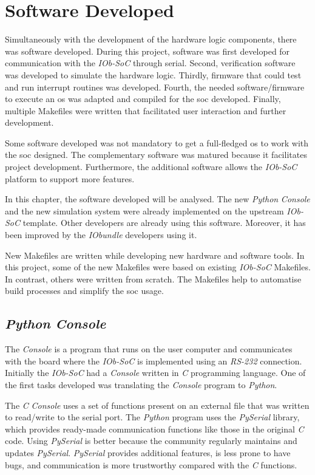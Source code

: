 \chapter{Software Developed}
\label{chapter:software_developed}
Simultaneously with the development of the hardware logic components, there was software developed. During this project, software was first developed for communication with the \textit{IOb-SoC} through serial. Second, verification software was developed to simulate the hardware logic. Thirdly, firmware that could test and run interrupt routines was developed. Fourth, the needed software/firmware to execute an \acrlong{os} was adapted and compiled for the \acrshort{soc} developed. Finally, multiple Makefiles were written that facilitated user interaction and further development.

Some software developed was not mandatory to get a full-fledged \acrlong{os} to work with the \acrlong{soc} designed. The complementary software was matured because it facilitates project development. Furthermore, the additional software allows the \textit{IOb-SoC} platform to support more features.

In this chapter, the software developed will be analysed. The new \textit{Python} \textit{Console} and the new simulation system were already implemented on the upstream \textit{IOb-SoC} template. Other developers are already using this software. Moreover, it has been improved by the \textit{IObundle} developers using it.

New Makefiles are written while developing new hardware and software tools. In this project, some of the new Makefiles were based on existing \textit{IOb-SoC} Makefiles. In contrast, others were written from scratch. The Makefiles help to automatise build processes and simplify the \acrshort{soc} usage.

\section{\textit{Python} \textit{Console}}
\label{section:pyhton_console}
The \textit{Console} is a program that runs on the user computer and communicates with the board where the \textit{IOb-SoC} is implemented using an \textit{RS-232} connection. Initially the \textit{IOb-SoC} had a \textit{Console} written in \textit{C} programming language. One of the first tasks developed was translating the \textit{Console} program to \textit{Python}.

The \textit{C} \textit{Console} uses a set of functions present on an external file that was written to read/write to the serial port. The \textit{Python} program uses the \textit{PySerial} library, which provides ready-made communication functions like those in the original \textit{C} code. Using \textit{PySerial} is better because the community regularly maintains and updates \textit{PySerial}. \textit{PySerial} provides additional features, is less prone to have bugs, and communication is more trustworthy compared with the \textit{C} functions.

